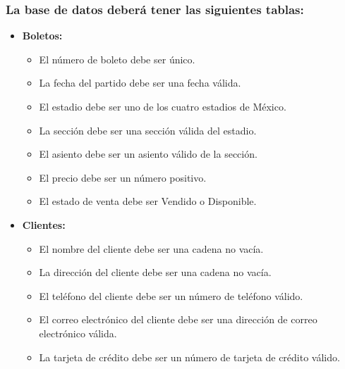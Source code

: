\subsubsection*{La base de datos deberá tener las siguientes tablas:}

\begin{itemize}
    \item \textbf{Boletos:}
        \begin{itemize}
            \item El número de boleto debe ser único.
            \item La fecha del partido debe ser una fecha válida.
            \item El estadio debe ser uno de los cuatro estadios de México.
            \item La sección debe ser una sección válida del estadio.
            \item El asiento debe ser un asiento válido de la sección.
            \item El precio debe ser un número positivo.
            \item El estado de venta debe ser Vendido o Disponible.
        \end{itemize}

    \item \textbf{Clientes:}
        \begin{itemize}
            \item El nombre del cliente debe ser una cadena no vacía.
            \item La dirección del cliente debe ser una cadena no vacía.
            \item El teléfono del cliente debe ser un número de teléfono válido.
            \item El correo electrónico del cliente debe ser una dirección de correo electrónico válida.
            \item La tarjeta de crédito debe ser un número de tarjeta de crédito válido.
        \end{itemize}


\end{itemize}
